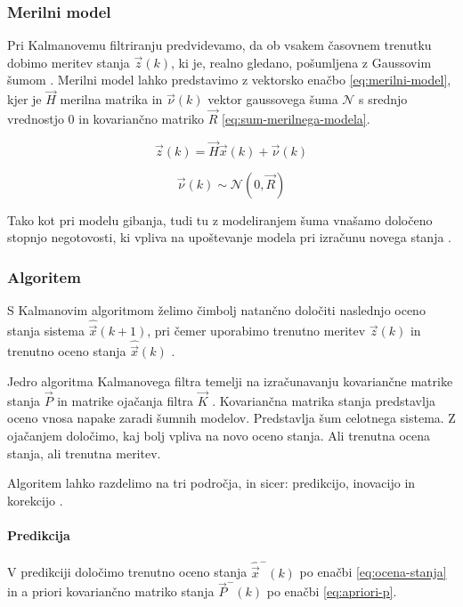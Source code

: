 \subsubsection{Merilni model}
Pri Kalmanovemu filtriranju predvidevamo, da ob vsakem časovnem trenutku dobimo meritev stanja $\vec{z}(k)$, ki je, realno gledano, pošumljena z Gaussovim šumom \cite{trucco1998introductory}. Merilni model lahko predstavimo z vektorsko enačbo \eqref{eq:merilni-model}, kjer je $\vec{H}$ merilna matrika in $\vec{\nu}(k)$ vektor gaussovega šuma $\mathcal{N}$ s srednjo vrednostjo $0$ in kovariančno matriko $\vec{R}$ \eqref{eq:sum-merilnega-modela}.


\begin{equation}
 \vec{z}(k) = \vec{H} \vec{x}(k) + \vec{\nu}(k)
 \label{eq:merilni-model}
\end{equation}

\begin{equation}
\vec{\nu}(k) \sim \mathcal{N} \left( 0, \vec{R} \right)
\label{eq:sum-merilnega-modela}
\end{equation}


Tako kot pri modelu gibanja, tudi tu z modeliranjem šuma vnašamo določeno stopnjo negotovosti, ki vpliva na upoštevanje modela pri izračunu novega stanja \cite{trucco1998introductory}.


\subsubsection{Algoritem}
S Kalmanovim algoritmom želimo čimbolj natančno določiti naslednjo oceno stanja sistema $\hat{\vec{x}}(k+1)$, pri čemer uporabimo trenutno meritev $\vec{z}(k)$ in trenutno oceno stanja $\hat{\vec{x}}(k)$ \cite{trucco1998introductory}. 

Jedro algoritma Kalmanovega filtra temelji na izračunavanju kovariančne matrike stanja $\vec{P}$ in matrike ojačanja filtra $\vec{K}$ \cite{trucco1998introductory}. Kovariančna matrika stanja predstavlja oceno vnosa napake zaradi šumnih modelov. Predstavlja šum celotnega sistema. Z ojačanjem določimo, kaj bolj vpliva na novo oceno stanja. Ali trenutna ocena stanja, ali trenutna meritev.

Algoritem lahko razdelimo na tri področja, in sicer: predikcijo, inovacijo in korekcijo \cite{trucco1998introductory}.

\paragraph{Predikcija}
V predikciji določimo trenutno oceno stanja $\hat{\vec{x}}^-(k)$ po enačbi \eqref{eq:ocena-stanja} in a priori kovariančno matriko stanja $\vec{P}^-(k)$ po enačbi \eqref{eq:apriori-p}.

